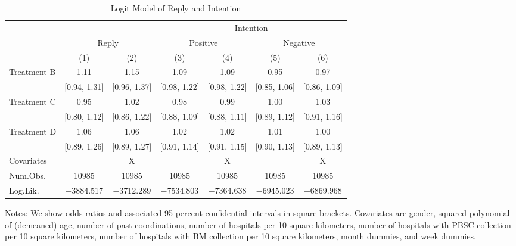\documentclass[
]{article}
\begin{document}
\begin{table}[H]

\caption{\label{tab:logit-stock}Logit Model of Reply and Intention}
\centering
\fontsize{9}{11}\selectfont
\begin{threeparttable}
\begin{tabular}[t]{lcccccc}
\toprule
\multicolumn{3}{c}{ } & \multicolumn{4}{c}{Intention} \\
\cmidrule(l{3pt}r{3pt}){4-7}
\multicolumn{1}{c}{ } & \multicolumn{2}{c}{Reply} & \multicolumn{2}{c}{Positive} & \multicolumn{2}{c}{Negative} \\
\cmidrule(l{3pt}r{3pt}){2-3} \cmidrule(l{3pt}r{3pt}){4-5} \cmidrule(l{3pt}r{3pt}){6-7}
  & (1) & (2) & (3) & (4) & (5) & (6)\\
\midrule
Treatment B & \num{1.11} & \num{1.15} & \num{1.09} & \num{1.09} & \num{0.95} & \num{0.97}\\
 & {}[\num{0.94}, \num{1.31}] & {}[\num{0.96}, \num{1.37}] & {}[\num{0.98}, \num{1.22}] & {}[\num{0.98}, \num{1.22}] & {}[\num{0.85}, \num{1.06}] & {}[\num{0.86}, \num{1.09}]\\
Treatment C & \num{0.95} & \num{1.02} & \num{0.98} & \num{0.99} & \num{1.00} & \num{1.03}\\
 & {}[\num{0.80}, \num{1.12}] & {}[\num{0.86}, \num{1.22}] & {}[\num{0.88}, \num{1.09}] & {}[\num{0.88}, \num{1.11}] & {}[\num{0.89}, \num{1.12}] & {}[\num{0.91}, \num{1.16}]\\
Treatment D & \num{1.06} & \num{1.06} & \num{1.02} & \num{1.02} & \num{1.01} & \num{1.00}\\
 & {}[\num{0.89}, \num{1.26}] & {}[\num{0.89}, \num{1.27}] & {}[\num{0.91}, \num{1.14}] & {}[\num{0.91}, \num{1.15}] & {}[\num{0.90}, \num{1.13}] & {}[\num{0.89}, \num{1.13}]\\
\midrule
Covariates &  & X &  & X &  & X\\
Num.Obs. & \num{10985} & \num{10985} & \num{10985} & \num{10985} & \num{10985} & \num{10985}\\
Log.Lik. & \num{-3884.517} & \num{-3712.289} & \num{-7534.803} & \num{-7364.638} & \num{-6945.023} & \num{-6869.968}\\
\bottomrule
\end{tabular}
\begin{tablenotes}
\item Notes: We show odds ratios and associated 95 percent confidential intervals in square brackets. Covariates are gender, squared polynomial of (demeaned) age, number of past coordinations, number of hospitals per 10 square kilometers, number of hospitals with PBSC collection per 10 square kilometers, number of hospitals with BM collection per 10 square kilometers, month dummies, and week dummies.
\end{tablenotes}
\end{threeparttable}
\end{table}
\end{document}

